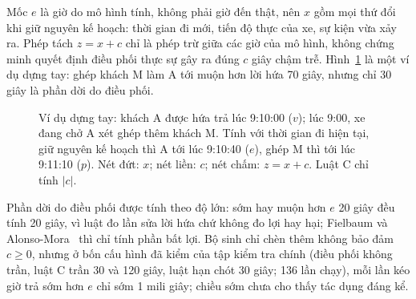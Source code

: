 Mốc $e$ là giờ do mô hình tính, không phải giờ đến thật, nên $x$ gồm mọi thứ đổi khi giữ nguyên kế hoạch: thời
gian đi mới, tiến độ thực của xe, sự kiện vừa xảy ra. Phép tách $z = x + c$ chỉ là phép trừ giữa các giờ của mô
hình, không chứng minh quyết định điều phối thực sự gây ra đúng $c$ giây chậm trễ. Hình~\ref{hinh:bamoc} là một ví
dụ dựng tay: ghép khách M làm A tới muộn hơn lời hứa 70 giây, nhưng chỉ 30 giây là phần dời do điều phối.

\begin{figure}[htbp]
\centering
{}
\caption{Ví dụ dựng tay: khách A được hứa trả lúc 9:10:00 ($v$); lúc 9:00, xe đang chở A xét ghép thêm khách M.
Tính với thời gian đi hiện tại, giữ nguyên kế hoạch thì A tới lúc 9:10:40 ($e$), ghép M thì tới lúc 9:11:10
($p$). Nét đứt: $x$; nét liền: $c$; nét chấm: $z = x + c$. Luật C chỉ tính $|c|$.}
\label{hinh:bamoc}
\end{figure}

Phần dời do điều phối được tính theo độ lớn: sớm hay muộn hơn $e$ 20 giây đều tính 20 giây, vì luật đo lần sửa
lời hứa chứ không đo lợi hay hại; Fielbaum và Alonso-Mora~\cite{fielbaum2020} thì chỉ tính phần bất lợi. Bộ sinh chỉ chèn thêm không bảo đảm $c \ge 0$, nhưng ở
bốn cấu hình đã kiểm của tập kiểm tra chính (điều phối không trần, luật C trần 30 và 120 giây, luật hạn chót 30
giây; 136 lần chạy), mỗi lần kéo giờ trả sớm hơn $e$ chỉ sớm 1 mili giây; chiều sớm chưa cho thấy tác dụng đáng kể.


